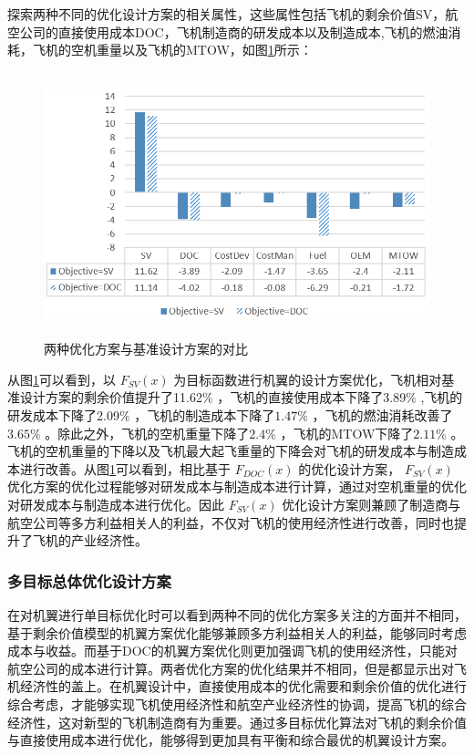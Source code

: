\documentclass[12pt,a4paper]{report}
\begin{document}
探索两种不同的优化设计方案的相关属性，这些属性包括飞机的剩余价值SV，航空公司的直接使用成本DOC，飞机制造商的研发成本以及制造成本,飞机的燃油消耗，飞机的空机重量以及飞机的MTOW，如图\ref{wing-comp2}所示：

\begin{figure}[ht!]
	\centering
	\includegraphics[width=5.06in,height=3.02in]{./media4/image31.png}
	\caption{两种优化方案与基准设计方案的对比}
	\label{wing-comp2}
\end{figure}

从图\ref{wing-comp2}可以看到，以 $F_{SV} \left( x \right)  $ 为目标函数进行机翼的设计方案优化，飞机相对基准设计方案的剩余价值提升了11.62$\%$ ，飞机的直接使用成本下降了3.89$\%$ ,飞机的研发成本下降了2.09$\%$ ，飞机的制造成本下降了$1.47\%$ ，飞机的燃油消耗改善了$3.65\%$ 。除此之外，飞机的空机重量下降了$2.4\%$ ，飞机的MTOW下降了$2.11\%$ 。飞机的空机重量的下降以及飞机最大起飞重量的下降会对飞机的研发成本与制造成本进行改善。从图\ref{wing-comp2}可以看到，相比基于 $ F_{DOC} \left( x \right)  $ 的优化设计方案， $ F_{SV} \left( x \right)  $ 优化方案的优化过程能够对研发成本与制造成本进行计算，通过对空机重量的优化对研发成本与制造成本进行优化。因此 $ F_{SV} \left( x \right)  $ 优化设计方案则兼顾了制造商与航空公司等多方利益相关人的利益，不仅对飞机的使用经济性进行改善，同时也提升了飞机的产业经济性。

\subsubsection{多目标总体优化设计方案}
在对机翼进行单目标优化时可以看到两种不同的优化方案多关注的方面并不相同，基于剩余价值模型的机翼方案优化能够兼顾多方利益相关人的利益，能够同时考虑成本与收益。而基于DOC的机翼方案优化则更加强调飞机的使用经济性，只能对航空公司的成本进行计算。两者优化方案的优化结果并不相同，但是都显示出对飞机经济性的盖上。在机翼设计中，直接使用成本的优化需要和剩余价值的优化进行综合考虑，才能够实现飞机使用经济性和航空产业经济性的协调，提高飞机的综合经济性，这对新型的飞机制造商有为重要。通过多目标优化算法对飞机的剩余价值与直接使用成本进行优化，能够得到更加具有平衡和综合最优的机翼设计方案。
\end{document}
